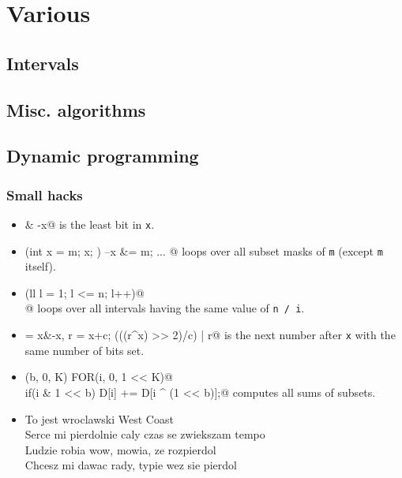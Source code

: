 \chapter{Various}

\section{Intervals}

\section{Misc. algorithms}

\section{Dynamic programming}
	\subsection{Small hacks}
		\begin{itemize}
			\item \verb@x & -x@ is the least bit in \texttt{x}.
			\item \verb@for(int x = m; x; ) { --x &= m; ... }@ loops over all subset masks of \texttt{m} (except \texttt{m} itself).
			\item \verb@for(ll l = 1; l <= n; l++)@ \\ @ loops over all intervals having the same value of \texttt{n / i}.
			\item \verb@c = x&-x, r = x+c; (((r^x) >> 2)/c) | r@ is the next number after \texttt{x} with the same number of bits set.
			\item \verb@FOR(b, 0, K) FOR(i, 0, 1 << K)@ \\ \verb@  if(i & 1 << b) D[i] += D[i ^ (1 << b)];@ computes all sums of subsets.
			\item	To jest wroclawski West Coast \\
					Serce mi pierdolnie caly czas se zwiekszam tempo \\
					Ludzie robia wow, mowia, ze rozpierdol \\
					Chcesz mi dawac rady, typie wez sie pierdol
		\end{itemize}

